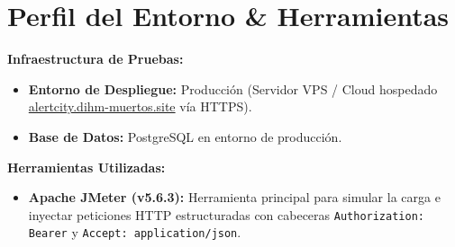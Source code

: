 \section{Perfil del Entorno \& Herramientas}
\textbf{Infraestructura de Pruebas:}
\begin{itemize}
    \item \textbf{Entorno de Despliegue:} Producción (Servidor VPS / Cloud hospedado \url{alertcity.dihm-muertos.site} vía HTTPS).
    \item \textbf{Base de Datos:} PostgreSQL en entorno de producción.
\end{itemize}

\textbf{Herramientas Utilizadas:}
\begin{itemize}
    \item \textbf{Apache JMeter (v5.6.3):} Herramienta principal para simular la carga e inyectar peticiones HTTP estructuradas con cabeceras \texttt{Authori\-zation: Bearer} y \texttt{Accept: application/json}.
\end{itemize}
